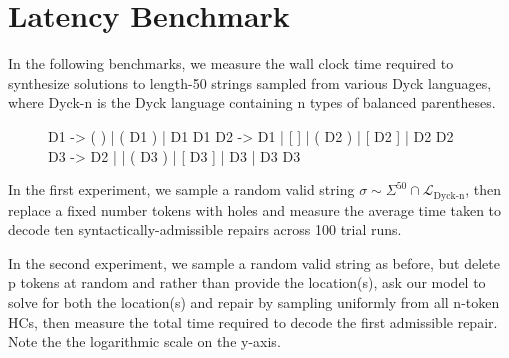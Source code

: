 \documentclass[sigplan,review,anonymous,acmsmall]{acmart}\settopmatter{printfolios=false,printccs=false,printacmref=false}
\begin{document}
%

\section{Latency Benchmark}\label{sec:latency}

In the following benchmarks, we measure the wall clock time required to synthesize solutions to length-50 strings sampled from various Dyck languages, where Dyck-n is the Dyck language containing n types of balanced parentheses.

\begin{figure}[H]
\begin{tidyinput}
D1 -> ( ) | ( D1 ) | D1 D1
D2 -> D1 | [ ] | ( D2 ) | [ D2 ] | D2 D2
D3 -> D2 | { } | ( D3 ) | [ D3 ] | { D3 } | D3 D3
\end{tidyinput}
\end{figure}

\noindent In the first experiment, we sample a random valid string $\sigma \sim \Sigma^{50} \cap \mathcal{L}_{\text{Dyck-n}}$, then replace a fixed number tokens with holes and measure the average time taken to decode ten syntactically-admissible repairs across 100 trial runs.

\begin{figure}[H]
\hspace{-0.25cm}
\end{figure}

\noindent In the second experiment, we sample a random valid string as before, but delete p tokens at random and rather than provide the location(s), ask our model to solve for both the location(s) and repair by sampling uniformly from all n-token HCs, then measure the total time required to decode the first admissible repair. Note the the logarithmic scale on the y-axis.
\end{document}
